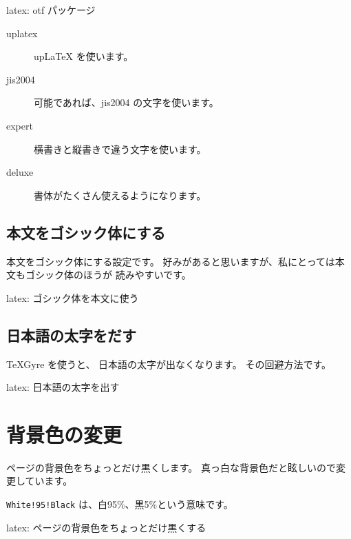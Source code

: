 \documentclass[dvipdfmx,a4j,14pt,uplatex,openany]{jsbook}
\begin{document}
\begin{programlist}[label={orgb150413}]{latex}{: otf パッケージ}\usepackage[uplatex,jis2004,expert,deluxe]{otf}
\end{programlist}

\begin{description}
\item[{uplatex}] upLaTeX を使います。
\item[{jis2004}] 可能であれば、jis2004 の文字を使います。
\item[{expert }] 横書きと縦書きで違う文字を使います。
\item[{deluxe }] 書体がたくさん使えるようになります。
\end{description}

\subsection{本文をゴシック体にする}
\label{sec:orgdc466f5}
本文をゴシック体にする設定です。
好みがあると思いますが、私にとっては本文もゴシック体のほうが
読みやすいです。

\begin{programlist}[label={orgd7005a9}]{latex}{: ゴシック体を本文に使う}\renewcommand{\kanjifamilydefault}{\gtdefault}
\end{programlist}

\subsection{日本語の太字をだす}
\label{sec:org2826421}
\TeX Gyre を使うと、 日本語の太字が出なくなります。
その回避方法です。

\begin{programlist}[label={org83e3c99}]{latex}{: 日本語の太字を出す}\renewcommand{\bfdefault}{bx}
\end{programlist}

\section{背景色の変更}
\label{sec:org41c5d25}
ページの背景色をちょっとだけ黒くします。
真っ白な背景色だと眩しいので変更しています。

\texttt{White!95!Black} は、白95\%、黒5\%という意味です。


\begin{programlist}[label={org85d0274}]{latex}{: ページの背景色をちょっとだけ黒くする}\usepackage[pagecolor={White!95!Black}]{pagecolor}
\end{programlist}
\end{document}
